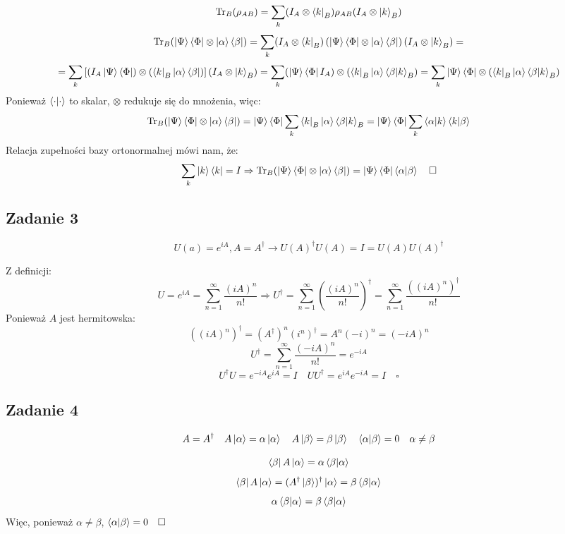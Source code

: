 \documentclass{../notatki}
\begin{document}
$$
\Tr_B(\rho_{AB}) = \sum_k (I_A \otimes \bra{k}_B) \rho_{AB} (I_A
\otimes \ket{k}_B)
$$
$$
\Tr_B(\ket{\Psi}\bra{\Phi} \otimes \ket{\alpha}\bra{\beta}) = \sum_k
(I_A \otimes \bra{k}_B)\left(\ket{\Psi}\bra{\Phi} \otimes
\ket{\alpha}\bra{\beta}\right) (I_A
\otimes \ket{k}_B) =
$$
$$
=\sum_k \left[(I_A \ket{\Psi}\bra{\Phi}) \otimes (\bra{k}_B
\ket{\alpha}\bra{\beta})\right] (I_A
\otimes \ket{k}_B) = \sum_k (\ket{\Psi}\bra{\Phi} I_A) \otimes (\bra{k}_B
\ket{\alpha}\bra{\beta} \ket{k}_B) = \sum_k \ket{\Psi}\bra{\Phi}
\otimes (\bra{k}_B
\ket{\alpha}\bra{\beta} \ket{k}_B)
$$
Ponieważ $\braket{\cdot}{\cdot}$ to skalar, $\otimes$ redukuje się do mnożenia,
więc:
$$
\Tr_B(\ket{\Psi}\bra{\Phi} \otimes \ket{\alpha}\bra{\beta}) =
\ket{\Psi}\bra{\Phi} \sum_k \bra{k}_B \ket{\alpha}\bra{\beta}
\ket{k}_B = \ket{\Psi}\bra{\Phi} \sum_k \braket{\alpha}{k} \braket{k}{\beta}
$$
Relacja zupełności bazy ortonormalnej mówi nam, że:
$$
\sum_k \ket{k}\bra{k} = I \Rightarrow \Tr_B(\ket{\Psi}\bra{\Phi}
\otimes \ket{\alpha}\bra{\beta}) = \ket{\Psi}\bra{\Phi}
\braket{\alpha}{\beta} \quad \square
$$

\subsection{Zadanie 3}

$$
U(a) = e^{iA}, A = A^\dag \rightarrow U(A)^\dag U(A) = I =
U(A)U(A)^\dag
$$

Z definicji:
$$
U = e^{iA} = \sum_{n=1}^{\infty} \frac{(iA)^n}{n!} \Rightarrow U^\dag
= \sum_{n=1}^{\infty} \left(\frac{(iA)^n}{n!}\right)^\dag =
\sum_{n=1}^{\infty} \frac{((iA)^n)^\dag}{n!}
$$
Ponieważ $A$ jest hermitowska:
$$
((iA)^n)^\dag = (A^\dag)^n(i^n)^\dag = A^n (-i)^n = (-iA)^n
$$
$$
U^\dag = \sum_{n=1}^{\infty} \frac{(-iA)^n}{n!} = e^{-iA}
$$
$$
U^\dag U = e^{-iA} e^{iA} = I \quad UU^\dag = e^{iA} e^{-iA} = I \quad \square
$$

\subsection{Zadanie 4}

$$
A = A^\dag \quad A\ket{\alpha} = \alpha \ket{\alpha} \quad A\ket{\beta} = \beta
\ket{\beta} \quad \braket{\alpha}{\beta} = 0 \quad \alpha \neq \beta
$$

$$
\bra{\beta}A\ket{\alpha} = \alpha \braket{\beta}{\alpha}
$$
$$
\bra{\beta}A\ket{\alpha} = (A^\dag \ket{\beta})^\dag \ket{\alpha} =
\beta \braket{\beta}{\alpha}
$$
$$
\alpha \braket{\beta}{\alpha} = \beta \braket{\beta}{\alpha}
$$
Więc, ponieważ $\alpha \neq \beta$, $\braket{\alpha}{\beta} = 0 \quad \square$
\end{document}
